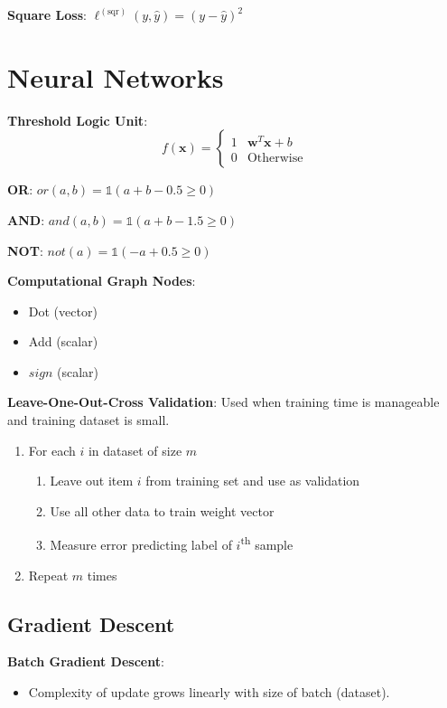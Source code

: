 \documentclass[10pt]{article}
\begin{document}
\begin{multicols}{3}
  \textbf{Square Loss}:
  $ \ell^{(\text{sqr})}(y,\hat{y}) = (y - \hat{y})^{2} $

  \section{Neural Networks}

  \textbf{Threshold Logic Unit}:
  \vspace{-4pt}
  \[ f(\mathbf{x}) = \begin{cases}
                          1 & \mathbf{w}^{T}\mathbf{x} + b \\
                          0 & \text{Otherwise}
                      \end{cases} \]

  \textbf{OR}: $or(a,b) =\mathbb{1}(a + b -0.5\geq0)$

  \vspace{6pt}\textbf{AND}: $and(a,b) =\mathbb{1}(a + b -1.5\geq0)$

  \vspace{6pt}\textbf{NOT}: $not(a) =\mathbb{1}(-a + 0.5\geq0)$

  \textbf{Computational Graph Nodes}:
  \begin{itemize}
    \item Dot (vector)
    \item Add (scalar)
    \item $sign$ (scalar)
  \end{itemize}

  \textbf{Leave-One-Out-Cross Validation}: Used when training time is manageable and training dataset is small.
  \begin{enumerate}
    \item For each $i$ in dataset of size $m$
      \begin{enumerate}
        \item Leave out item $i$ from training set and use as validation
        \item Use all other data to train weight vector
        \item Measure error predicting label of $i$\textsuperscript{th} sample
      \end{enumerate}
    \item Repeat $m$ times
  \end{enumerate}

  \subsection*{Gradient Descent}
  \textbf{Batch Gradient Descent}:
  \begin{itemize}
    \item Complexity of update grows linearly with size of batch (dataset).
  \end{itemize}


\end{multicols}
\end{document}
